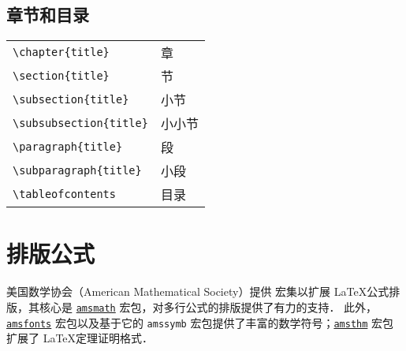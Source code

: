 \subsection{章节和目录}
%
\begin{table}[h]
	\centering
	\begin{tabular}{l l}
		\hline
		\verb|\chapter{|{\color{gray}\verb|title|}\verb|}|       & 章 \\
		\verb|\section{|{\color{gray}\verb|title|}\verb|}|       & 节 \\
		\verb|\subsection{|{\color{gray}\verb|title|}\verb|}|    & 小节 \\
		\verb|\subsubsection{|{\color{gray}\verb|title|}\verb|}| & 小小节 \\
		\verb|\paragraph{|{\color{gray}\verb|title|}\verb|}|     & 段 \\
		\verb|\subparagraph{|{\color{gray}\verb|title|}\verb|}|  & 小段 \\
		\verb|\tableofcontents|                                  & 目录 \\
		\hline
	\end{tabular}
\end{table}
%

\newpage
\section{排版公式}
%
美国数学协会（American Mathematical Society）提供  \AmS 宏集以扩展 \LaTeX 公式排版，其核心是 \href{https://ctan.org/pkg/amsmath}{\texttt{amsmath}} 宏包，对多行公式的排版提供了有力的支持．
此外，\href{https://ctan.org/pkg/amsfonts}{\texttt{amsfonts}} 宏包以及基于它的 \verb|amssymb| 宏包提供了丰富的数学符号；\href{https://ctan.org/pkg/amsthm}{\texttt{amsthm}} 宏包扩展了 \LaTeX 定理证明格式．

